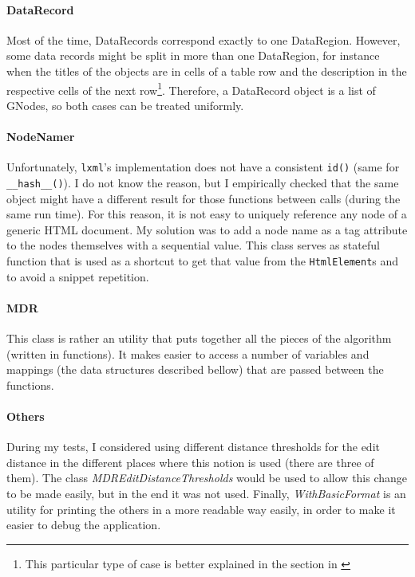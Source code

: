 \documentclass[10pt]{article}
\newcommand{\code}[1]{\colorbox{codegray}{\texttt{#1}}}
\begin{document}
\paragraph{DataRecord} \label{txt:class-data-record} Most of the time, DataRecords correspond exactly to one DataRegion. However, some data records might be split in more than one DataRegion, for instance when the titles of the objects are in cells of a table row and the description in the respective cells of the next row\footnote{This particular type of case is better explained in the section  in \cite{mdr}}. Therefore, a DataRecord object is a list of GNodes, so both cases can be treated uniformly.

\paragraph{NodeNamer} Unfortunately, \code{lxml}'s implementation does not have a consistent \code{id()} (same for \code{\_\_hash\_\_()}). I do not know the reason, but I empirically checked that the same object might have a different result for those functions between calls (during the same run time). For this reason, it is not easy to uniquely reference any node of a generic HTML document. My solution was to add a node name as a tag attribute to the nodes themselves with a sequential value. This class serves as stateful function that is used as a shortcut to get that value from the \code{HtmlElement}s and to avoid a snippet repetition. 

\paragraph{MDR} This class is rather an utility that puts together all the pieces of the algorithm (written in functions). It makes easier to access a number of variables and mappings (the data structures described bellow) that are passed between the functions.

\paragraph{Others} During my tests, I considered using different distance thresholds for the edit distance in the different places where this notion is used (there are three of them). The class \emph{MDREditDistanceThresholds} would be used to allow this change to be made easily, but in the end it was not used. Finally, \emph{WithBasicFormat} is an utility for printing the others in a more readable way easily, in order to make it easier to debug the application.
\end{document}
